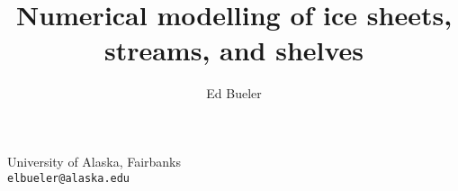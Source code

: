 %
%
%




\usepackage{times}
{
  \usepackage[left=1.5cm,right=6cm,top=1.5cm,bottom=3cm]{geometry}
}

\usepackage{hyperref}

\usepackage[T1]{fontenc}

\usepackage{verbatim}
\usepackage{empheq}
\usepackage{color}
\usepackage{animate}
\usepackage{graphicx}


\def\lecturename{Numerical modelling of ice sheets, streams, and shelves}

\title[Numerical modelling of ice sheets]{Numerical modelling of ice sheets, streams, and shelves}

\author[Bueler]{Ed Bueler}

\institute
{
  University of Alaska, Fairbanks \\
  \texttt{elbueler@alaska.edu}
}







